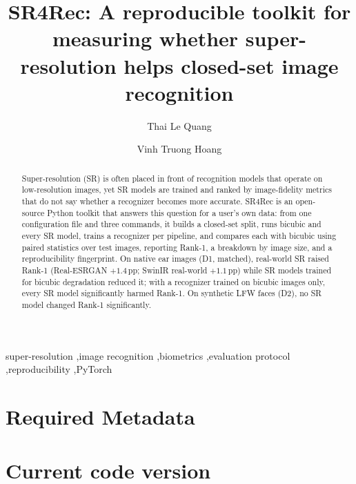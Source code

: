 \documentclass[preprint,12pt]{elsarticle}
\begin{document}
\begin{frontmatter}

\title{SR4Rec: A reproducible toolkit for measuring whether super-resolution helps closed-set image recognition}

\author[hcmou,hub]{Thai Le Quang}
\author[hcmou]{Vinh Truong Hoang}

\begin{abstract}
Super-resolution (SR) is often placed in front of recognition models that operate on
low-resolution images, yet SR models are trained and ranked by image-fidelity metrics that do not
say whether a recognizer becomes more accurate. SR4Rec is an open-source Python toolkit that
answers this question for a user's own data: from one configuration file and three commands, it
builds a closed-set split, runs bicubic and every SR model, trains a recognizer per pipeline, and
compares each with bicubic using paired statistics over test images, reporting Rank-1, a breakdown
by image size, and a reproducibility fingerprint. On native ear images (D1, matched), real-world SR
raised Rank-1 (Real-ESRGAN $+1.4$\,pp; SwinIR real-world $+1.1$\,pp) while SR models trained for
bicubic degradation reduced it; with a recognizer trained on bicubic images only, every SR model
significantly harmed Rank-1. On synthetic LFW faces (D2), no SR model changed Rank-1 significantly.
\end{abstract}

\begin{keyword}
super-resolution \sep image recognition \sep biometrics \sep evaluation protocol \sep reproducibility \sep PyTorch
\end{keyword}

\end{frontmatter}

\section*{Required Metadata}
\label{sec:metadata}

\section*{Current code version}
\end{document}
